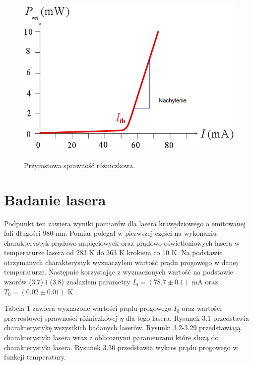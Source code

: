 \documentclass[a4paper, portrait,12pt]{report}
\begin{document}
\begin{figure}[h]
\center
  \includegraphics[scale=0.40]{slope.png}
  \label{rys1}
  \caption{Przyrostowa sprawność różniczkowa.} 
\end{figure}

\newpage

\section{Badanie lasera}
Podpunkt ten zawiera wyniki pomiarów dla lasera krawędziowego o emitowanej fali długości 980 nm.
Pomiar polegał w pierwszej części na wykonaniu charakterystyk prądowo-napięciowych
oraz prądowo-oświetleniowych lasera w temperaturze lasera od 283 K do 363 K krokiem co 10 K.
Na podstawie otrzymanych charakterystyk wyznaczyłem wartość prądu progowego w danej temperaturze.
Następnie korzystając z wyznaczonych wartość na podstawie wzorów (3.7) i (3.8) znalazłem
parametry $I_{0} = (78.7 \pm 0.1)$ mA oraz $T_0 = (0.02 \pm 0.01)$ K.

Tabela 1 zawiera wyznazone wartości prądu progowego $I_0$ oraz wartości przyrostowej sprawności różniczkowej $\eta$ dla tego lasera. Rysunek 3.1 przedstawia charakterystykę wszystkich badanych laserów. Rysunki 3.2-3.29 przedstawiają charakterystyki lasera wraz z oblicoznymi paramenrami które słuzą do charakterystyki lasera. Rysunek 3.30 przedstawia wykres prądu progowego w funkcji temperatury. \\ 
\end{document}
